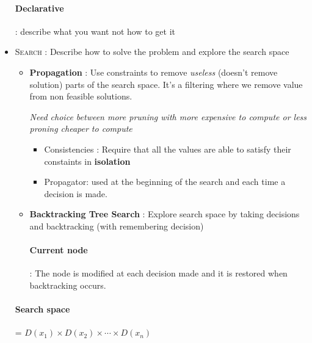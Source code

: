 \begin{itemize}
        \paragraph{Declarative} : describe what you want not how to get it

    \item \textsc{Search} : Describe how to solve the problem and
        explore the search space
        \begin{itemize}
            \item \textbf{Propagation} : Use constraints to remove
                \textit{useless} (doesn't remove solution) parts of the
                search space. It's a filtering where we remove
                value from non feasible solutions.
                \begin{center}
                    \scriptsize
                    \textit{Need choice between more pruning with more
                        expensive to compute or less proning cheaper to
                    compute}
                \end{center}

                \begin{itemize}
                    \item Consistencies : Require that all the values
                        are able to satisfy their constaints in
                        \textbf{isolation}

                    \item Propagator: used at the beginning of the search
                        and each time a decision is made.
                \end{itemize}
            \item \textbf{Backtracking Tree Search} : Explore search
                space by taking decisions and backtracking (with
                remembering decision)

                \paragraph{Current node}: The node is modified at each decision
                made and it is restored when backtracking occurs.
        \end{itemize}

        \paragraph{Search space} = $D(x_1) \times D(x_2) \times \cdots \times D(x_n)$
\end{itemize}

